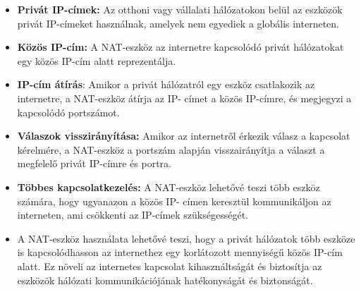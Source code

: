 \documentclass[11pt,a4paper]{article}
\begin{document}
            \begin{tcolorbox}[colback=blue!5!white,colframe=blue!50!black,title= 43. Ismertesse a NAT (Network Address Translator) eszközt használatát az internethez való kapcsolódásban!]
                \begin{itemize}
                    \item \textbf{Privát IP-címek:} Az otthoni vagy vállalati hálózatokon belül az eszközök privát IP-címeket használnak, amelyek nem egyediek a globális interneten.
                    \item \textbf{Közös IP-cím:} A NAT-eszköz az internetre kapcsolódó privát hálózatokat egy közös IP-cím alatt reprezentálja.
                    \item \textbf{IP-cím átírás}: Amikor a privát hálózatról egy eszköz csatlakozik az internetre, a NAT-eszköz átírja az IP- címet a közös IP-címre, és megjegyzi a kapcsolódó portszámot.
                    \item \textbf{Válaszok visszirányítása:} Amikor az internetről érkezik válasz a kapcsolat kérelmére, a NAT-eszköz a portszám alapján visszairányítja a választ a megfelelő privát IP-címre és portra.
                    \item \textbf{Többes kapcsolatkezelés:} A NAT-eszköz lehetővé teszi több eszköz számára, hogy ugyanazon a közös IP- címen keresztül kommunikáljon az interneten, ami csökkenti az IP-címek szükségességét.
                    \item A NAT-eszköz használata lehetővé teszi, hogy a privát hálózatok több eszköze is kapcsolódhasson az internethez egy korlátozott mennyiségű közös IP-cím alatt. Ez növeli az internetes kapcsolat kihasználtságát és biztosítja az eszközök hálózati kommunikációjának hatékonyságát és biztonságát.
                \end{itemize}
            \end{tcolorbox}
\end{document}
